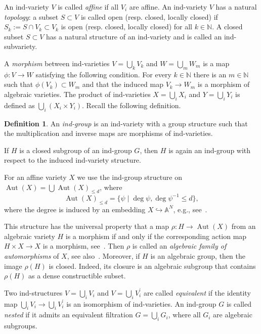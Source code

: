 \documentclass[12pt,a4paper]{amsart}
\theoremstyle{plain}
\theoremstyle{definition}
\newtheorem{definition}[theorem]{Definition}
\theoremstyle{remark}
\def\Aut{\operatorname{Aut}}
\def\AA{{\mathbb A}}
\def\embed{\hookrightarrow}
\begin{document}
   An ind-variety $V$ is called \emph{affine} if all $V_i$ are affine.
An ind-variety $V$ has a natural \emph{topology}: a subset $S \subset V$ is called open (resp. closed, locally closed) if $S_k := S \cap V_k \subset V_k$ is open (resp. closed, locally closed) for all $k \in \mathbb{N}$.
A closed subset $S \subset V$ has a natural structure of an ind-variety and is called an ind-subvariety.



A \emph{morphism} between ind-varieties $V = \bigcup_k V_k$ and $W = \bigcup_m W_m$ is a map $\phi: V \to W$ satisfying the following condition. For every $k \in \mathbb{N}$ there is an $m \in \mathbb{N}$ such that 
$\phi(V_k) \subset W_m$ and that the induced map $V_k \to W_m$ is a morphism of algebraic varieties. The product of ind-varieties $X=\bigcup_i X_i$ and $Y=\bigcup_i Y_i$ is defined as $\bigcup_i (X_i\times Y_i)$. 
 Recall the following definition.

\begin{definition}
   An \emph{ind-group} is an ind-variety with a group structure such that the multiplication and inverse maps are morphisms of ind-varieties. 
\end{definition}

If $H$ is a closed subgroup of an ind-group $G$, then $H$ is again an ind-group with respect to the induced ind-variety structure.
 
For an affine variety $X$ we use the ind-group structure on $\Aut(X)=\bigcup\Aut(X)_{\le d}$, where 
\[
   \Aut(X)_{\le d}=\{\psi\mid\deg\psi,\deg\psi^{-1}\le d\},
\]
where the degree is induced by an embedding $X\embed\AA^N$, e.g., see~\cite[Section~5.2]{FK}.

This structure has the universal property that a map $\rho\colon H\to\Aut(X)$ from an algebraic variety $H$ is a morphism if and only if the corresponding action map $H\times X\to X$ is a morphism, see~\cite[Theorem~5.1.1]{FK}.
Then $\rho$ is called an \emph{algebraic family of automorphisms} of $X$, see also~\cite{Ram}.
Moreover, if $H$ is an algebraic group, then the image $\rho(H)$ is closed.
Indeed, its closure is an algebraic subgroup that contains $\rho(H)$ as a dense constructible subset. 

Two ind-structures $V=\bigcup_i V_i$ and $V=\bigcup_i V_i^\prime$
are called \emph{equivalent} if the identity map $\bigcup_i V_i\to \bigcup_i V_i^\prime$ is an isomorphism of ind-varieties.
 An ind-group $G$ is called \emph{nested} if it admits an equivalent
filtration $G=\bigcup_i G_i$, where all $G_i$ are algebraic subgroups.
 
\end{document}

